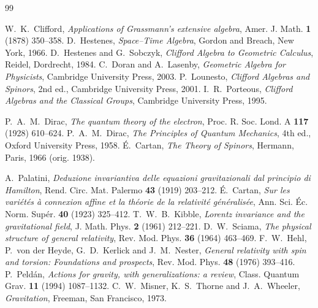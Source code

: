 \documentclass[11pt,oneside]{book}
\theoremstyle{plain}
\theoremstyle{definition}
\theoremstyle{remark}
\begin{document}
\backmatter
\begin{thebibliography}{99}

 W.~K.~Clifford, \emph{Applications of Grassmann's
extensive algebra}, Amer. J. Math. \textbf{1} (1878) 350--358.
 D.~Hestenes, \emph{Space--Time Algebra}, Gordon and Breach,
New York, 1966.
 D.~Hestenes and G.~Sobczyk, \emph{Clifford Algebra
to Geometric Calculus}, Reidel, Dordrecht, 1984.
 C.~Doran and A.~Lasenby, \emph{Geometric Algebra for
Physicists}, Cambridge University Press, 2003.
 P.~Lounesto, \emph{Clifford Algebras and Spinors}, 2nd ed.,
Cambridge University Press, 2001.
 I.~R.~Porteous, \emph{Clifford Algebras and the Classical
Groups}, Cambridge University Press, 1995.

 P.~A.~M.~Dirac, \emph{The quantum theory of the electron},
Proc. R. Soc. Lond. A \textbf{117} (1928) 610--624.
 P.~A.~M.~Dirac, \emph{The Principles of Quantum Mechanics},
4th ed., Oxford University Press, 1958.
 \'E.~Cartan, \emph{The Theory of Spinors}, Hermann, Paris,
1966 (orig. 1938).

 A.~Palatini, \emph{Deduzione invariantiva delle equazioni
gravitazionali dal principio di Hamilton}, Rend. Circ. Mat. Palermo \textbf{43}
(1919) 203--212.
 \'E.~Cartan, \emph{Sur les vari\'et\'es \`a connexion affine
et la th\'eorie de la relativit\'e g\'en\'eralis\'ee}, Ann. Sci. \'Ec. Norm.
Sup\'er. \textbf{40} (1923) 325--412.
 T.~W.~B.~Kibble, \emph{Lorentz invariance and the
gravitational field}, J. Math. Phys. \textbf{2} (1961) 212--221.
 D.~W.~Sciama, \emph{The physical structure of general
relativity}, Rev. Mod. Phys. \textbf{36} (1964) 463--469.
 F.~W.~Hehl, P.~von der Heyde, G.~D.~Kerlick and
J.~M.~Nester, \emph{General relativity with spin and torsion: Foundations and
prospects}, Rev. Mod. Phys. \textbf{48} (1976) 393--416.
 P.~Peld\'an, \emph{Actions for gravity, with generalizations:
a review}, Class. Quantum Grav. \textbf{11} (1994) 1087--1132.
 C.~W.~Misner, K.~S.~Thorne and J.~A.~Wheeler, \emph{Gravitation},
Freeman, San Francisco, 1973.


\end{thebibliography}
\end{document}
